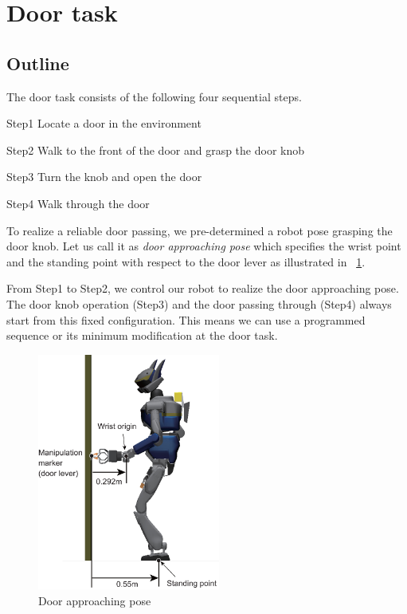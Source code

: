 \section{Door task}
	\label{sub:door}

\subsection{Outline}
%
The door task consists of the following four sequential steps.
%
\begin{description}
\item{Step1} Locate a door in the environment
\item{Step2} Walk to the front of the door and grasp the door knob
\item{Step3} Turn the knob and open the door
\item{Step4} Walk through the door
\end{description}
%

%

To realize a reliable door passing, we pre-determined
a robot pose grasping the door knob.
Let us call it as {\it door approaching pose} which specifies the
wrist point and the standing point with respect to the door lever
as illustrated in \figurename~\ref{fig:door_approaching_config}.

From Step1 to Step2, we control our robot to realize the door approaching pose.
The door knob operation (Step3) and the door passing through (Step4) always start
from this fixed configuration. This means we can use a programmed sequence or its minimum
modification at the door task.  

\begin{figure}[t]
  \centering
  \includegraphics[width = 6cm]{img/door_approaching_config}
  \caption{Door approaching pose}
  \label{fig:door_approaching_config}
\end{figure}
        
